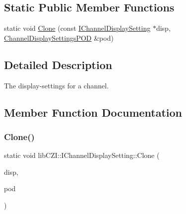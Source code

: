 \subsection*{Static Public Member Functions}
\begin{DoxyCompactItemize}
\item 
static void \hyperlink{classlib_c_z_i_1_1_i_channel_display_setting_ac7569b65161bdfbc2cc8841e2c9fc45d}{Clone} (const \hyperlink{classlib_c_z_i_1_1_i_channel_display_setting}{I\+Channel\+Display\+Setting} $\ast$disp, \hyperlink{structlib_c_z_i_1_1_channel_display_settings_p_o_d}{Channel\+Display\+Settings\+P\+OD} \&pod)
\end{DoxyCompactItemize}


\subsection{Detailed Description}
The display-\/settings for a channel. 

\subsection{Member Function Documentation}
\mbox{\label{classlib_c_z_i_1_1_i_channel_display_setting_ac7569b65161bdfbc2cc8841e2c9fc45d}} 
\subsubsection{\texorpdfstring{Clone()}{Clone()}}
{\footnotesize\ttfamily static void lib\+C\+Z\+I\+::\+I\+Channel\+Display\+Setting\+::\+Clone (\begin{DoxyParamCaption}\item[{const \hyperlink{classlib_c_z_i_1_1_i_channel_display_setting}{I\+Channel\+Display\+Setting} $\ast$}]{disp,  }\item[{\hyperlink{structlib_c_z_i_1_1_channel_display_settings_p_o_d}{Channel\+Display\+Settings\+P\+OD} \&}]{pod }\end{DoxyParamCaption})\hspace{0.3cm}{\ttfamily [static]}}


